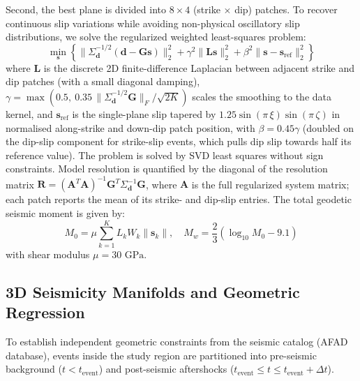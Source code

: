 \documentclass[11pt,a4paper]{article}
\begin{document}
Second, the best plane is divided into $8 \times 4$ (strike $\times$ dip) patches. To recover continuous slip variations while avoiding non-physical oscillatory slip distributions, we solve the regularized weighted least-squares problem:
\begin{equation}
\min_{\mathbf{s}} \left\{ \| \Sigma_{\mathbf{d}}^{-1/2} (\mathbf{d} - \mathbf{G}\mathbf{s}) \|_2^2 + \gamma^2 \| \mathbf{L}\mathbf{s} \|_2^2 + \beta^2 \| \mathbf{s} - \mathbf{s}_{\text{ref}} \|_2^2 \right\}
\end{equation}
where $\mathbf{L}$ is the discrete 2D finite-difference Laplacian between adjacent strike and dip patches (with a small diagonal damping), $\gamma = \max\!\left(0.5,\ 0.35\,\|\Sigma_{\mathbf{d}}^{-1/2}\mathbf{G}\|_F / \sqrt{2K}\right)$ scales the smoothing to the data kernel, and $\mathbf{s}_{\text{ref}}$ is the single-plane slip tapered by $1.25 \sin(\pi\,\xi)\sin(\pi\,\zeta)$ in normalised along-strike and down-dip patch position, with $\beta = 0.45\gamma$ (doubled on the dip-slip component for strike-slip events, which pulls dip slip towards half its reference value). The problem is solved by SVD least squares without sign constraints. Model resolution is quantified by the diagonal of the resolution matrix $\mathbf{R} = (\mathbf{A}^T\mathbf{A})^{-1} \mathbf{G}^T \Sigma_{\mathbf{d}}^{-1} \mathbf{G}$, where $\mathbf{A}$ is the full regularized system matrix; each patch reports the mean of its strike- and dip-slip entries. The total geodetic seismic moment is given by:
\begin{equation}
M_0 = \mu \sum_{k=1}^K L_k W_k \|\mathbf{s}_k\|, \quad M_w = \frac{2}{3} \left( \log_{10} M_0 - 9.1 \right)
\end{equation}
with shear modulus $\mu = 30\text{ GPa}$.

\subsection{3D Seismicity Manifolds and Geometric Regression}
To establish independent geometric constraints from the seismic catalog (AFAD database), events inside the study region are partitioned into pre-seismic background ($t < t_{\text{event}}$) and post-seismic aftershocks ($t_{\text{event}} \le t \le t_{\text{event}} + \Delta t$).
\end{document}
